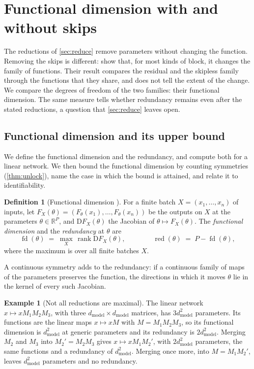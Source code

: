\documentclass[10pt]{article}
\theoremstyle{definition}
\newtheorem{definition}[theorem]{Definition}
\newtheorem{example}[theorem]{Example}
\theoremstyle{remark}
\newcommand{\R}{\mathbb{R}}
\newcommand{\dm}{d_{\mathrm{model}}}
\newcommand{\Der}{\mathrm{D}}
\begin{document}
\section{Functional dimension with and without skips}\label{sec:gain}
The reductions of \cref{sec:reduce} remove parameters without changing the function. Removing the skips is different: \citet{mijoski2026worth} show that, for most kinds of block, it changes the family of functions. Their result compares the residual and the skipless family through the functions that they share, and does not tell the extent of the change. We compare the degrees of freedom of the two families: their functional dimension. The same measure tells whether redundancy remains even after the stated reductions, a question that \cref{sec:reduce} leaves open.

\subsection{Functional dimension and its upper bound}\label{sec:fd}\label{sec:count}

We define the functional dimension and the redundancy, and compute both for a linear network. We then bound the functional dimension by counting symmetries (\cref{thm:unlock}), name the case in which the bound is attained, and relate it to identifiability.

\begin{definition}[Functional dimension {\citep{grigsby2022functional}}]\label{def:fd}
For a finite batch $X = (x_1, \dots, x_n)$ of inputs, let $F_X(\theta) = (F_\theta(x_1), \dots, F_\theta(x_n))$ be the outputs on $X$ at the parameters $\theta \in \R^P$, and $\Der F_X(\theta)$ the Jacobian of $\theta \mapsto F_X(\theta)$. The \emph{functional dimension} and the \emph{redundancy} at $\theta$ are
\[
\operatorname{fd}(\theta) \;=\; \max_{X}\, \operatorname{rank} \Der F_X(\theta), \qquad\qquad \operatorname{red}(\theta) \;=\; P - \operatorname{fd}(\theta),
\]
where the maximum is over all finite batches $X$.
\end{definition}

A continuous symmetry adds to the redundancy: if a continuous family of maps of the parameters preserves the function, the directions in which it moves $\theta$ lie in the kernel of every such Jacobian.

\begin{example}[Not all reductions are maximal]\label{ex:three}
The linear network $x \mapsto xM_1M_2M_3$, with three $\dm\times\dm$ matrices, has $3\dm^2$ parameters. Its functions are the linear maps $x \mapsto xM$ with $M = M_1M_2M_3$, so its functional dimension is $\dm^2$ at generic parameters and its redundancy is $2\dm^2$. Merging $M_2$ and $M_3$ into $M_2' = M_2M_3$ gives $x \mapsto xM_1M_2'$, with $2\dm^2$ parameters, the same functions and a redundancy of $\dm^2$. Merging once more, into $M = M_1M_2'$, leaves $\dm^2$ parameters and no redundancy.
\end{example}
\end{document}
